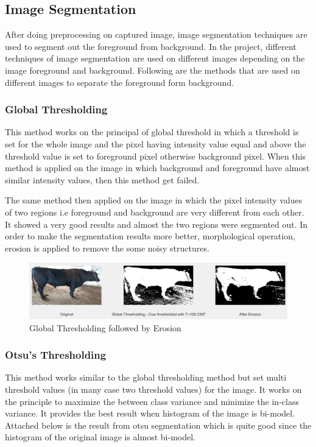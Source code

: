 \documentclass{article}
\begin{document}
\subsection{Image Segmentation}

After doing preprocessing on captured image, image segmentation techniques are used to segment out the foreground from background. In the project, different techniques of image segmentation are used on different images depending on the image foreground and background. 
Following are the methods that are used on different images to separate the foreground form background.
\subsubsection{Global Thresholding}
This method works on the principal of global threshold in which a threshold is set for the whole image and the pixel having intensity value equal and above the threshold value is set to foreground pixel otherwise background pixel. When this method is applied on the image in which background and foreground have almost similar intensity values, then this method get failed.

The same method then applied on the image in which the pixel intensity values of two regions i.e foreground and background are very different from each other. It showed a very good results and almost the two regions were segmented out. In order to make the segmentation results more better, morphological operation, erosion is applied to remove the some noisy structures. 

\begin{figure}[h]
    \centering
    \includegraphics [scale=0.25] {g_t}
    \caption{Global Thresholding followed by Erosion}
    \end{figure}

\subsubsection{Otsu's Thresholding}

This method works similar to the global thresholding method but set multi threshold values (in many case two threshold values) for the image. It works on the principle to maximize the between class variance and minimize the in-class variance.
It provides the best result when histogram of the image is bi-model. Attached below is the result from otsu segmentation which is quite good since the histogram of the original image is almost bi-model. 
\end{document}
